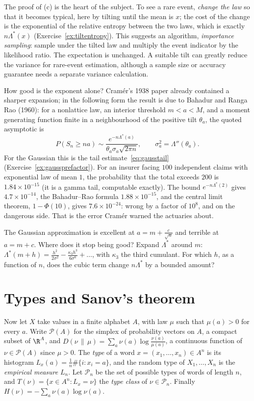 The proof of (c) is the heart of the subject. To see a rare event, \emph{change the law} so that it becomes typical, here by tilting until the mean is $x$; the cost of the
change is the exponential of the relative entropy between the two laws, which is exactly $n\Lambda^*(x)$ (Exercise~\ref{ex:tiltentropy}). This suggests an algorithm, \emph{importance sampling}: sample under the tilted law and multiply the event indicator by the likelihood ratio. The expectation is unchanged. A suitable tilt can greatly reduce the variance for rare-event estimation, although a sample size or accuracy guarantee needs a separate variance calculation.

How good is the exponent alone? Cram\'er's 1938 paper already contained a sharper expansion; in the following form the result is due to Bahadur and Ranga Rao
(1960): for a nonlattice law, an interior threshold $m<a<M$, and a moment generating function finite in a neighbourhood of the positive tilt $\theta_a$, the quoted asymptotic is
\[
P(S_n\ge na)\sim\frac{e^{-n\Lambda^*(a)}}{\theta_a\sigma_a\sqrt{2\pi n}},\qquad\sigma_a^2=\Lambda''(\theta_a).
\]
For the Gaussian this is the tail estimate~\eqref{eq:gausstail} (Exercise~\ref{ex:gaussprefactor}). For an insurer facing $100$ independent claims with exponential law of mean $1$,
the probability that the total exceeds $200$ is $1.84\times10^{-15}$ (it is a gamma tail, computable exactly). The bound $e^{-n\Lambda^*(2)}$ gives $4.7\times10^{-14}$, the
Bahadur--Rao formula $1.88\times10^{-15}$, and the central limit theorem, $1-\Phi(10)$, gives $7.6\times10^{-24}$: wrong by a factor of $10^8$, and on the dangerous side.
That is the error Cram\'er warned the actuaries about.

\begin{think}
The Gaussian approximation is excellent at $a=m+\frac c{\sqrt n}$ and terrible at $a=m+c$. Where does it stop being good? Expand $\Lambda^*$ around $m$:
$\Lambda^*(m+h)=\frac{h^2}{2\sigma^2}-\frac{\kappa_3h^3}{6\sigma^6}+\dots$, with $\kappa_3$ the third cumulant. For which $h$, as a function of $n$, does the cubic term change $n\Lambda^*$ by
a bounded amount?
\end{think}

\section{Types and Sanov's theorem}

Now let $X$ take values in a finite alphabet $A$, with law $\mu$ such that $\mu(a)>0$ for every $a$. Write $\mathcal P(A)$ for the simplex of probability vectors on $A$, a
compact subset of $\R^A$, and $D(\nu\,\|\,\mu)=\sum_a\nu(a)\log\frac{\nu(a)}{\mu(a)}$, a continuous function of $\nu\in\mathcal P(A)$ since $\mu>0$. The \emph{type} of a word
$x=(x_1,\dots,x_n)\in A^n$ is its histogram $L_x(a)=\frac1n\#\{i:x_i=a\}$, and the random type of $X_1,\dots,X_n$ is the \emph{empirical measure} $L_n$. Let $\mathcal P_n$ be the set of
possible types of words of length $n$, and $T(\nu)=\{x\in A^n:L_x=\nu\}$ the \emph{type class} of $\nu\in\mathcal P_n$. Finally $H(\nu)=-\sum_a\nu(a)\log\nu(a)$.

